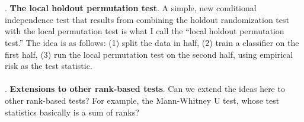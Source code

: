 \documentclass[12pt]{article}
\begin{document}
\\ \\ . \textbf{The local holdout permutation test}. A simple, new conditional independence test that results from combining the holdout randomization test \parencite{Tansey2021a} with the local permutation test \parencite{Kim2021} is what I call the ``local holdout permutation test.'' The idea is as follows: (1) split the data in half, (2) train a classifier on the first half, (3) run the local permutation test on the second half, using empirical risk as the test statistic.
\\ \\ . \textbf{Extensions to other rank-based tests}. Can we extend the ideas here to other rank-based tests? For example, the Mann-Whitney U test, whose test statistics basically is a sum of ranks?

\end{document}
